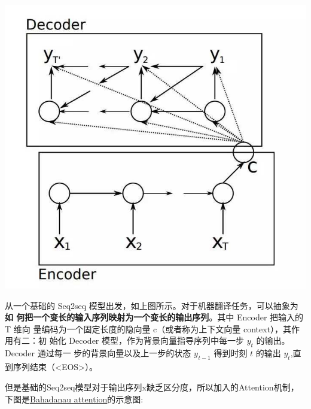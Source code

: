 \documentclass[UTF8,a4paper,10pt]{ctexart}
\begin{document}
    \centerline{\includegraphics[scale=0.3]{pics/190417-s1.jpg}}
从一个基础的 Seq2seq 模型出发，如上图所示。对于机器翻译任务，可以抽象为\textbf{如
何把一个变长的输入序列映射为一个变长的输出序列}。其中 Encoder 把输入的 T 维向
量编码为一个固定长度的隐向量 c（或者称为上下文向量 context），其作用有二：初
始化 Decoder 模型，作为背景向量指导序列中每一步 $y_t$ 的输出。Decoder 通过每一
步的背景向量以及上一步的状态 $y_{_{}t-1}$ 得到时刻 $t$ 的输出 $y_t$,直到序列结束（<EOS>）。

但是基础的Seq2seq模型对于输出序列x缺乏区分度，所以加入的Attention机制，下图是\href{https://arxiv.org/abs/1409.0473}{\color{blue}Bahadanau attention}的示意图:
    
\end{document}
